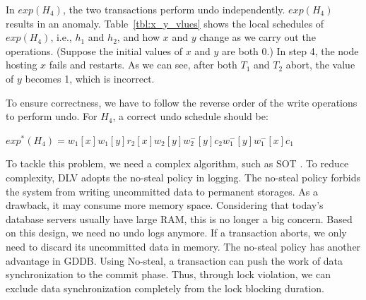 \documentclass[conference]{IEEEtran}
\begin{document}
In $exp(H_4)$, the two transactions perform undo independently. $exp(H_4)$ results in an anomaly.
Table~\ref{tbl:x_y_vlues} shows the local schedules of $exp(H_4)$, i.e., ${h_1}$ and  ${h_2}$, and how ${x}$ and ${y}$ change as we carry out the operations.
(Suppose the initial values of ${x}$ and ${y}$ are both 0.)
In step 4, the node hosting ${x}$ fails and restarts.
As we can see, after both ${T_1}$ and ${T_2}$ abort, the value of ${y}$ becomes 1, which is incorrect.

To ensure correctness, we have to follow the reverse order of the write operations to perform undo.
For ${H_4}$, a correct undo schedule should be:
\begin{center}
${exp^*(H_4) = w_1[x]w_1[y]r_2[x]w_2[y]w^-_2[y]c_2w^-_1[y]w^-_1[x]c_1}$
\end{center}

To tackle this problem, we need a complex algorithm, such as SOT \cite{UnifyCR:journals/is/AlonsoVABASW94}.
To reduce complexity, DLV adopts the no-steal policy in logging.
The no-steal policy forbids the system from writing uncommitted data to permanent storages.
As a drawback, it may consume more memory space.
Considering that today's database servers usually have large RAM, this is no longer a big concern.
Based on this design, we need no undo logs anymore. If a transaction aborts, we only need to discard its uncommitted data in memory.
The no-steal policy has another advantage in GDDB.
Using No-steal, a transaction can push the work of data synchronization to the commit phase.
Thus, through lock violation, we can exclude data synchronization completely from the lock blocking duration.
\end{document}
